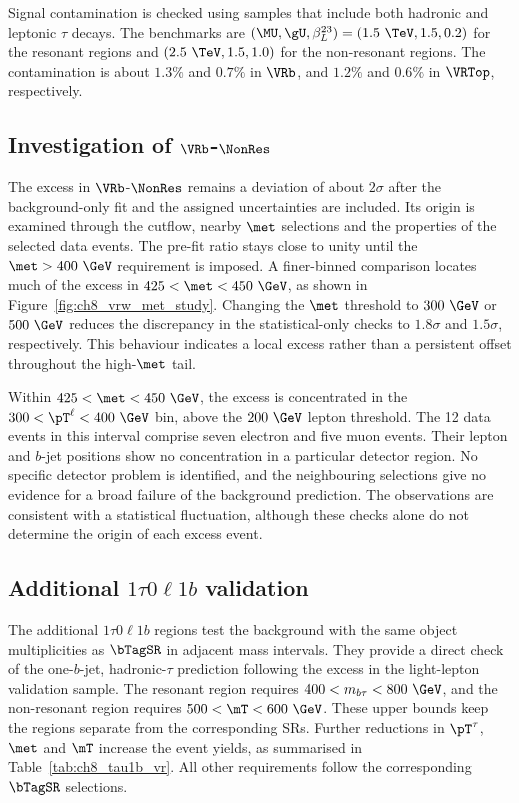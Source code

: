 Signal contamination is checked using samples that include both hadronic and leptonic $\tau$ decays.
The benchmarks are $(\MU,\gU,\beta_L^{23})=(1.5~\TeV,1.5,0.2)$ for the resonant regions and $(2.5~\TeV,1.5,1.0)$ for the non-resonant regions.
The contamination is about $1.3\%$ and $0.7\%$ in $\VRb$, and $1.2\%$ and $0.6\%$ in $\VRTop$, respectively.


\clearpage
\subsection[Investigation of VRW-NonRes]{Investigation of $\VRb$-$\NonRes$}
\label{subsec:ch8_vrw_excess}

The excess in $\VRb$-$\NonRes$ remains a deviation of about $2\sigma$ after the background-only fit and the assigned uncertainties are included.
Its origin is examined through the cutflow, nearby $\met$ selections and the properties of the selected data events.
The pre-fit ratio stays close to unity until the $\met>400~\GeV$ requirement is imposed.
A finer-binned comparison locates much of the excess in $425<\met<450~\GeV$, as shown in Figure~\ref{fig:ch8_vrw_met_study}.
Changing the $\met$ threshold to $300~\GeV$ or $500~\GeV$ reduces the discrepancy in the statistical-only checks to $1.8\sigma$ and $1.5\sigma$, respectively.
This behaviour indicates a local excess rather than a persistent offset throughout the high-$\met$ tail.

Within $425<\met<450~\GeV$, the excess is concentrated in the $300<\pT^\ell<400~\GeV$ bin, above the $200~\GeV$ lepton threshold.
The 12 data events in this interval comprise seven electron and five muon events.
Their lepton and $b$-jet positions show no concentration in a particular detector region.
No specific detector problem is identified, and the neighbouring selections give no evidence for a broad failure of the background prediction.
The observations are consistent with a statistical fluctuation, although these checks alone do not determine the origin of each excess event.


\clearpage
\subsection[Additional 1tau0l1b validation]{Additional $1\tau0\ell1b$ validation}
\label{subsec:ch8_tau1b_vr}

The additional $1\tau0\ell1b$ regions test the background with the same object multiplicities as $\bTagSR$ in adjacent mass intervals.
They provide a direct check of the one-$b$-jet, hadronic-$\tau$ prediction following the excess in the light-lepton validation sample.
The resonant region requires $400<m_{b\tau}<800~\GeV$, and the non-resonant region requires $500<\mT<600~\GeV$.
These upper bounds keep the regions separate from the corresponding SRs.
Further reductions in $\pT^\tau$, $\met$ and $\mT$ increase the event yields, as summarised in Table~\ref{tab:ch8_tau1b_vr}.
All other requirements follow the corresponding $\bTagSR$ selections.

